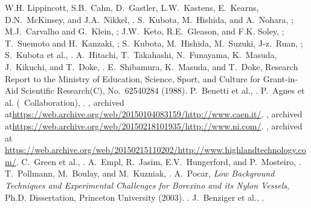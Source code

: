 \documentclass[preprint,12pt]{elsarticle}
\begin{document}
\begin{thebibliography}{00}
W.H. Lippincott, S.B.~Cahn, D.~Gastler, L.W.~Kastens, E.~Kearns, D.N.~McKinsey, and J.A.~Nikkel, .
S.~Kubota, M.~Hishida, and A.~Nohara, ;
M.J.~Carvalho and G.~Klein, ;
J.W.~Keto, R.E.~Gleason, and F.K. Soley, ;
T.~Suemoto and H.~Kanzaki, ;
S.~Kubota, M.~Hishida, M.~Suzuki, J-z.~Ruan, ;
S.~Kubota et al., .
A.~Hitachi, T.~Takahashi, N.~Funayama, K.~Masuda, J.~Kikuchi, and T.~Doke, .
 E.~Shibamura, K.~Masuda, and T.~Doke, Research Report to the Ministry of Education, Science, Sport, and Culture for Grant-in-Aid Scientific Research(C), No.~62540284 (1988).
P.~Benetti et al., .
P.~Agnes et al. (\ds\ Collaboration), .
, archived at\newline  \url{https://web.archive.org/web/20150104083159/http://www.caen.it/}.
, archived at\newline  \url{https://web.archive.org/web/20150218101935/http://www.ni.com/}.
, archived at \url{https://web.archive.org/web/20150215110202/http://www.highlandtechnology.com/}.
 C.~Green et al., .
A.~Empl, R.~Jasim, E.V.~Hungerford, and P.~Mosteiro, .
 T.~Pollmann, M.~Boulay, and M.~Kuzniak, .
 A.~Pocar, {\it Low Background Techniques and Experimental Challenges for Borexino and its Nylon Vessels}, Ph.D. Dissertation, Princeton University (2003).  .
J.~Benziger et al., .

\end{thebibliography}
\end{document}
